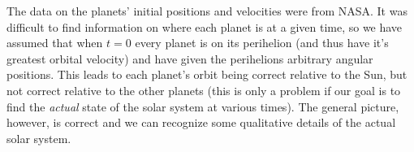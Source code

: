 The data on the planets' initial positions and velocities were from NASA. It was difficult to find information on where each planet is at a given time, so we have assumed that when $t=0$ every planet is on its perihelion (and thus have it's greatest orbital velocity) and have given the perihelions arbitrary angular positions. This leads to each planet's orbit being correct relative to the Sun, but not correct relative to the other planets (this is only a problem if our goal is to find the \emph{actual} state of the solar system at various times). The general picture, however, is correct and we can recognize some qualitative details of the actual solar system.
